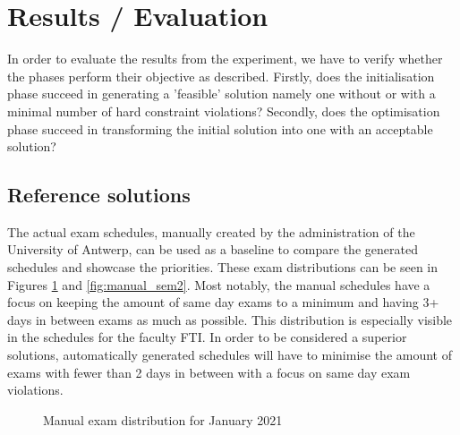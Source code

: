 
\section{Results / Evaluation}\label{sec:results}

In order to evaluate the results from the experiment, we have to verify whether the phases perform their objective as described. Firstly, does the initialisation phase succeed in generating a 'feasible' solution namely one without or with a minimal number of hard constraint violations? Secondly, does the optimisation phase succeed in transforming the initial solution into one with an acceptable solution?

\subsection{Reference solutions}

The actual exam schedules, manually created by the administration of the University of Antwerp, can be used as a baseline to compare the generated schedules and showcase the priorities. These exam distributions can be seen in Figures \ref{fig:manual_sem1} and \ref{fig:manual_sem2}. Most notably, the manual schedules have a focus on keeping the amount of same day exams to a minimum and having 3+ days in between exams as much as possible. This distribution is especially visible in the schedules for the faculty FTI. In order to be considered a superior solutions, automatically generated schedules will have to minimise the amount of exams with fewer than 2 days in between with a focus on same day exam violations.

\begin{figure}[h]
  \centering
  \hfill
  \caption{Manual exam distribution for January 2021}
  \label{fig:manual_sem1}
\end{figure}

